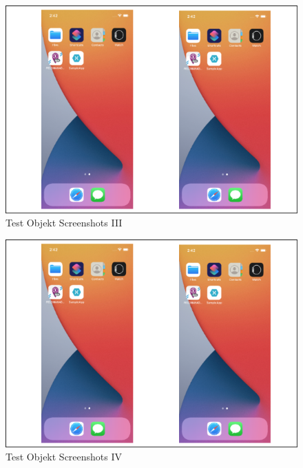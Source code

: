 \begin{figure}[!ht]
 \includegraphics[width=\textwidth,keepaspectratio]{Images/Screenshot/AppIconAndMenu.png}
 \caption[]{Test Objekt Screenshots III}
\end{figure}

\begin{figure}[!ht]
 \includegraphics[width=\textwidth,keepaspectratio]{Images/Screenshot/AppIconAndMenu.png}
 \caption[]{Test Objekt Screenshots IV}
\end{figure}


